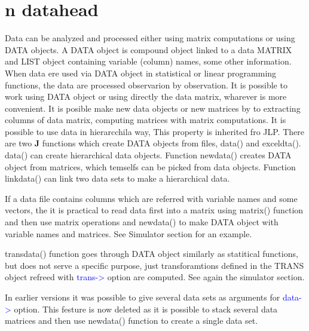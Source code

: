 \section{n datahead}
\label{datahead}
Data can be analyzed and processed either using matrix computations
or using DATA objects. A DATA object is compound object
linked to a data MATRIX and LIST object containing variable (column) names,
some other information.
When data ere used via DATA object in statistical or linear programming
functions, the data are processed observarion by observation.
It is possible to work using DATA object or using directly the data matrix, wharever is more
convenient. It is posible make new data objects or new matrices
by to extracting  columns of data matrix, computing matrices with matrix computations.
It is possible to use data in hierarcchila way, This property is inherited fro JLP.
There are two \textbf{J} functions which create DATA objects from files, \textcolor{VioletRed}{data}() and
exceldta(). \textcolor{VioletRed}{data}() can create hierarchical data objects. Function \textcolor{VioletRed}{newdata}() creates  DATA object from matrices, which temselfs can be
picked from data objects. Function \textcolor{VioletRed}{linkdata}() can link two data sets to make a hierarchical data.
\begin{note}
If a data file contains columns which are referred with variable names and some vectors,
the it is practical to read data first into a matrix using \textcolor{VioletRed}{matrix}() function and then
use matrix operations and \textcolor{VioletRed}{newdata}() to make DATA object with variable names and matrices.
See Simulator section for an example.
\end{note}
\begin{note}
\textcolor{VioletRed}{transdata}() function goes through DATA object similarly as statitical functions, but
does not serve a specific purpose, just transforamtions defined in the TRANS object refreed with
\textcolor{blue}{trans->} option are computed. See again the simulator section.
\end{note}
\begin{note}
In earlier versions it was possible to give several data sets as arguments for \textcolor{blue}{data->} option.
This festure is now deleted as it is possible to stack several data matrices and then use \textcolor{VioletRed}{newdata}() function to create a single data set.
\end{note}
